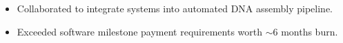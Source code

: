\documentclass[a4paper, margin]{res}
\begin{document}
\begin{sloppypar}
\begin{resume}
    \begin{itemize}
        \item Collaborated to integrate systems into automated DNA assembly pipeline.
        \item Exceeded software milestone payment requirements worth $\sim$6 months burn.
    \end{itemize}



\end{resume}
\end{sloppypar}
\end{document}
